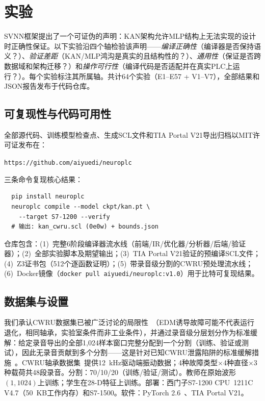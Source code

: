 \documentclass[journal,onecolumn]{IEEEtran}
\theoremstyle{definition}
\theoremstyle{plain}
\theoremstyle{remark}
\begin{document}
\section{实验}
\label{sec:experiments}

SVNN框架提出了一个可证伪的声明：KAN架构允许MLP结构上无法实现的设计时正确性保证。以下实验沿四个轴检验该声明——\textit{编译正确性}（编译器是否保持语义？）、\textit{验证差距}（KAN/MLP鸿沟是真实的且结构性的？）、\textit{通用性}（保证是否跨数据域和架构迁移？）和\textit{操作可行性}（编译代码是否适配并在真实PLC上运行？）。每个实验标注其所属轴。共计64个实验（E1--E57 + V1--V7），全部结果和JSON报告发布于代码仓库。

\subsection{可复现性与代码可用性}
\label{sec:reproducibility}

全部源代码、训练模型检查点、生成SCL文件和TIA Portal V21导出归档以MIT许可证发布在：
\begin{center}
\texttt{https://github.com/aiyuedi/neuroplc}
\end{center}

三条命令复现核心结果：
\begin{verbatim}
  pip install neuroplc
  neuroplc compile --model ckpt/kan.pt \
    --target S7-1200 --verify
  # 输出: kan_cwru.scl (0e0w) + bounds.json
\end{verbatim}

仓库包含：(1)~完整6阶段编译器流水线（前端/IR/优化器/分析器/后端/验证器）；(2)~全部实验脚本及期望输出；(3)~TIA Portal V21验证的预编译SCL文件；(4)~Z3证书包（512个逐函数证明）；(5)~带录音级分割的CWRU预处理流水线；(6)~Docker镜像（\texttt{docker pull aiyuedi/neuroplc:v1.0}）用于比特可复现结果。

\subsection{数据集与设置}

我们承认CWRU数据集已被广泛讨论的局限性~\cite{smith2015rolling,hendriks2022towards}（EDM诱导故障可能不代表运行退化，相同轴承，实验室条件而非工业条件），并通过录音级分层划分作为标准缓解：给定录音导出的全部1,024样本窗口完整分配到一个分割（训练、验证或测试），因此无录音贡献到多个分割——这是针对已知CWRU泄露陷阱的标准缓解措施~\cite{hendriks2022towards}。CWRU轴承数据集~\cite{cwru_bearing}提供12~kHz驱动端振动数据；4种故障类型$\times$4种直径$\times$3种载荷共48段录音。分割：70/10/20（训练/验证/测试）。教师在原始波形$(1,1024)$上训练；学生在28-D特征上训练。部署：西门子S7-1200 CPU~1211C V4.7（50~KB工作内存）和S7-1500。软件：PyTorch 2.6~\cite{paszke2019pytorch}、TIA Portal V21。
\end{document}
